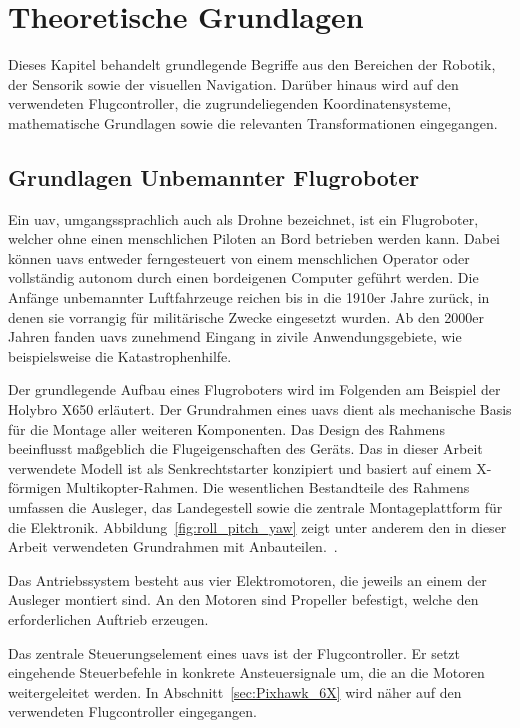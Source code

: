 
\chapter{Theoretische Grundlagen}
\label{cap:theoretische_grundlagen}
Dieses Kapitel behandelt grundlegende Begriffe aus den Bereichen der Robotik, 
der Sensorik sowie der visuellen Navigation.
Darüber hinaus wird auf den verwendeten Flugcontroller, die zugrundeliegenden Koordinatensysteme, mathematische Grundlagen sowie die relevanten Transformationen eingegangen. 


\section{Grundlagen Unbemannter Flugroboter}
\label{sec:grundlagen_uav}
Ein \gls{uav}, umgangssprachlich auch als Drohne bezeichnet, ist ein Flugroboter, welcher ohne einen menschlichen Piloten an Bord betrieben werden kann.
Dabei können \gls{uav}s entweder ferngesteuert von einem menschlichen Operator oder vollständig autonom durch einen bordeigenen Computer geführt werden.
Die Anfänge unbemannter Luftfahrzeuge reichen bis in die 1910er Jahre zurück, in denen sie vorrangig für militärische Zwecke eingesetzt wurden.
Ab den 2000er Jahren fanden \gls{uav}s zunehmend Eingang in zivile Anwendungsgebiete, wie beispielsweise die Katastrophenhilfe.~\cite{Studiawan2026}

Der grundlegende Aufbau eines Flugroboters wird im Folgenden am Beispiel der Holybro X650 erläutert.
Der Grundrahmen eines \gls{uav}s dient als mechanische Basis für die Montage aller weiteren Komponenten.
Das Design des Rahmens beeinflusst maßgeblich die Flugeigenschaften des Geräts.
Das in dieser Arbeit verwendete Modell ist als Senkrechtstarter konzipiert und basiert auf einem X-förmigen Multikopter-Rahmen.
Die wesentlichen Bestandteile des Rahmens umfassen die Ausleger, das Landegestell sowie die zentrale Montageplattform für die Elektronik.
Abbildung~\ref{fig:roll_pitch_yaw} zeigt unter anderem den in dieser Arbeit verwendeten Grundrahmen mit Anbauteilen.~\cite{Wu2021, holybro_x650}.

Das Antriebssystem besteht aus vier Elektromotoren, die jeweils an einem der Ausleger montiert sind.
An den Motoren sind Propeller befestigt, welche den erforderlichen Auftrieb erzeugen.

Das zentrale Steuerungselement eines \gls{uav}s ist der Flugcontroller.
Er setzt eingehende Steuerbefehle in konkrete Ansteuersignale um, die an die Motoren weitergeleitet werden.
In Abschnitt~\ref{sec:Pixhawk_6X} wird näher auf den verwendeten Flugcontroller eingegangen.

